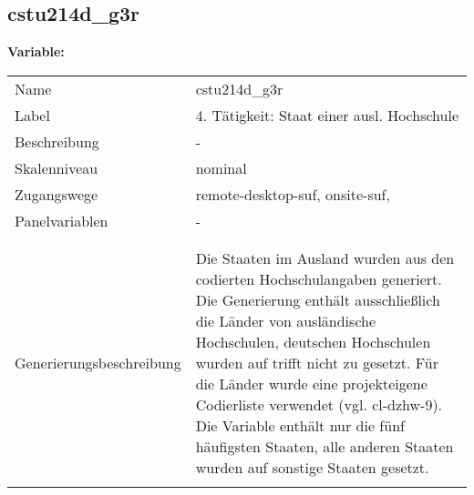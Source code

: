 	
	
	\subsection{cstu214d\_g3r}
	\label{subSection:cstu214d_g3r}

	\noindent\textbf{Variable:}\\
		\begin{tabular}{lL{11.3cm}}
			\label{tableVariable:cstu214d_g3r}
			Name & cstu214d\_g3r \\
			Label & 4. Tätigkeit: Staat einer ausl. Hochschule \\
			Beschreibung & - \\
			Skalenniveau & nominal \\
			Zugangswege &
				remote-desktop-suf,
				onsite-suf,
 \\
			Panelvariablen & -
			 \\
			 \\
 \\
					Generierungsbeschreibung & Die Staaten im Ausland wurden aus den codierten Hochschulangaben generiert. Die Generierung enthält ausschließlich die Länder von ausländische Hochschulen, deutschen Hochschulen wurden auf trifft nicht zu gesetzt. Für die Länder wurde eine projekteigene Codierliste verwendet (vgl. cl-dzhw-9). Die Variable enthält nur die fünf häufigsten Staaten, alle anderen Staaten wurden auf sonstige Staaten gesetzt. 
				 \\	
			 \\
		\end{tabular}






